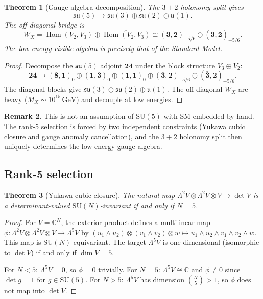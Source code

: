 \documentclass[12pt]{article}
\theoremstyle{plain}
\newtheorem{theorem}{Theorem}[section]
\theoremstyle{definition}
\newtheorem{remark}[theorem]{Remark}
\numberwithin{equation}{section}
\begin{document}
\begin{theorem}[Gauge algebra decomposition]\label{thm:gaugedecomp}
The $3+2$ holonomy split gives
\[
\mathfrak{su}(5)\to\mathfrak{su}(3)\oplus\mathfrak{su}(2)\oplus\mathfrak{u}(1).
\]
The off-diagonal bridge is
\[
W_X = \operatorname{Hom}(V_2,V_3)\oplus\overline{\operatorname{Hom}(V_2,V_3)}
\cong (\mathbf{3},\mathbf{2})_{-5/6}\oplus(\bar{\mathbf{3}},\mathbf{2})_{+5/6}.
\]
The low-energy visible algebra is precisely that of the Standard Model.
\end{theorem}

\begin{proof}
Decompose the $\mathfrak{su}(5)$ adjoint $\mathbf{24}$ under the block
structure $V_3\oplus V_2$:
\[
\mathbf{24}\to(\mathbf{8},\mathbf{1})_0\oplus(\mathbf{1},\mathbf{3})_0
\oplus(\mathbf{1},\mathbf{1})_0\oplus(\mathbf{3},\mathbf{2})_{-5/6}
\oplus(\bar{\mathbf{3}},\mathbf{2})_{+5/6}.
\]
The diagonal blocks give $\mathfrak{su}(3)\oplus\mathfrak{su}(2)\oplus\mathfrak{u}(1)$.
The off-diagonal $W_X$ are heavy ($M_X\sim10^{15}\,\mathrm{GeV}$)
and decouple at low energies.
\end{proof}

\begin{remark}
This is not an assumption of $\mathrm{SU}(5)$ with SM embedded by hand.
The rank-5 selection is forced by two independent constraints
(Yukawa cubic closure and gauge anomaly cancellation), and the $3+2$
holonomy split then uniquely determines the low-energy gauge algebra.
\end{remark}

\subsection{Rank-5 selection}\label{sec:rank5}

\begin{theorem}[Yukawa cubic closure]\label{thm:yukawa}
The natural map $\Lambda^2 V\otimes\Lambda^2 V\otimes V\to\det V$
is a determinant-valued $\mathrm{SU}(N)$-invariant if and only if $N=5$.
\end{theorem}

\begin{proof}
For $V=\mathbb{C}^N$, the exterior product defines a multilinear map
$\phi:\Lambda^2 V\otimes\Lambda^2 V\otimes V\to\Lambda^5 V$ by
$(u_1\wedge u_2)\otimes(v_1\wedge v_2)\otimes w\mapsto u_1\wedge u_2\wedge v_1\wedge v_2\wedge w$.
This map is $\mathrm{SU}(N)$-equivariant.  The target $\Lambda^5 V$ is one-dimensional
(isomorphic to $\det V$) if and only if $\dim V=5$.

For $N<5$: $\Lambda^5 V=0$, so $\phi=0$ trivially.
For $N=5$: $\Lambda^5 V\cong\mathbb{C}$ and $\phi\neq0$ since $\det g=1$ for $g\in\mathrm{SU}(5)$.
For $N>5$: $\Lambda^5 V$ has dimension $\binom{N}{5}>1$, so $\phi$ does not map into $\det V$.
\end{proof}
\end{document}
